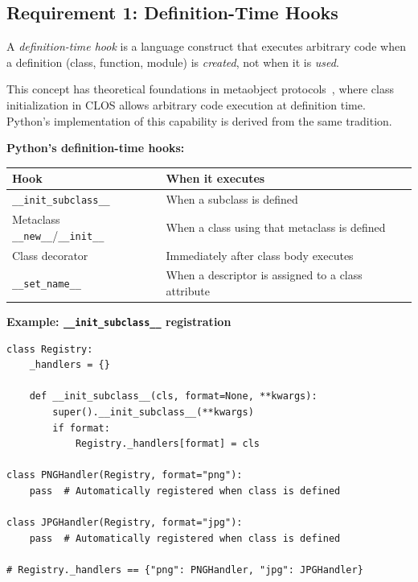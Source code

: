 \subsection{Requirement 1: Definition-Time Hooks}\label{sec:hooks}

\begin{definition}\label{def:hook}
A \emph{definition-time hook} is a language construct that executes arbitrary code when a definition (class, function, module) is \emph{created}, not when it is \emph{used}.
\end{definition}

This concept has theoretical foundations in metaobject protocols~\cite{kiczales1991art}, where class initialization in CLOS allows arbitrary code execution at definition time. Python's implementation of this capability is derived from the same tradition.

\textbf{Python's definition-time hooks:}

\begin{center}
\begin{tabular}{lp{8cm}}
\toprule
\textbf{Hook} & \textbf{When it executes} \\
\midrule
\texttt{\_\_init\_subclass\_\_} & When a subclass is defined \\
Metaclass \texttt{\_\_new\_\_}/\texttt{\_\_init\_\_} & When a class using that metaclass is defined \\
Class decorator & Immediately after class body executes \\
\texttt{\_\_set\_name\_\_} & When a descriptor is assigned to a class attribute \\
\bottomrule
\end{tabular}
\end{center}

\textbf{Example: \texttt{\_\_init\_subclass\_\_} registration}

\begin{verbatim}
class Registry:
    _handlers = {}

    def __init_subclass__(cls, format=None, **kwargs):
        super().__init_subclass__(**kwargs)
        if format:
            Registry._handlers[format] = cls

class PNGHandler(Registry, format="png"):
    pass  # Automatically registered when class is defined

class JPGHandler(Registry, format="jpg"):
    pass  # Automatically registered when class is defined

# Registry._handlers == {"png": PNGHandler, "jpg": JPGHandler}
\end{verbatim}

